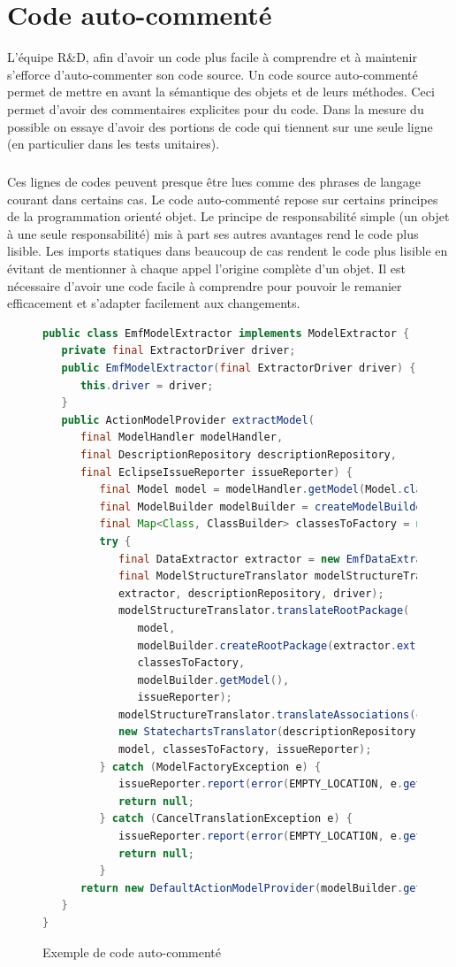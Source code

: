 \section{Code auto-commenté}\label{autoComm}
L'équipe R\&D, afin d'avoir un code plus facile à comprendre et à maintenir s'efforce d'auto-commenter son code source. Un code source auto-commenté permet de mettre en avant la sémantique des objets et de leurs méthodes. Ceci permet d'avoir des commentaires explicites pour du code. Dans la mesure du possible on essaye d'avoir des portions de code qui tiennent sur une seule ligne (en particulier dans les tests unitaires).
\subparagraph*{}Ces lignes de codes peuvent presque être lues comme des phrases de langage courant dans certains cas. Le code auto-commenté repose sur certains principes de la programmation orienté objet. Le principe de responsabilité simple (un objet à une seule responsabilité) mis à part ses autres avantages rend le code plus lisible. Les imports statiques dans beaucoup de cas rendent le code plus lisible en évitant de mentionner à chaque appel l'origine complète d'un objet. Il est nécessaire d'avoir une code facile à comprendre pour pouvoir le remanier efficacement et s'adapter facilement aux changements. 
\begin{figure}[!ht]
\centering
\begin{lstlisting}[language=java]
public class EmfModelExtractor implements ModelExtractor {
   private final ExtractorDriver driver;
   public EmfModelExtractor(final ExtractorDriver driver) {
      this.driver = driver;
   }
   public ActionModelProvider extractModel(
      final ModelHandler modelHandler,
      final DescriptionRepository descriptionRepository,
      final EclipseIssueReporter issueReporter) {
         final Model model = modelHandler.getModel(Model.class);
         final ModelBuilder modelBuilder = createModelBuilder(model.getName());
         final Map<Class, ClassBuilder> classesToFactory = new TreeMap<Class, ClassBuilder>(NAMED_ELEMENTS_COMPARATOR);
         try {
            final DataExtractor extractor = new EmfDataExtractor(driver);
            final ModelStructureTranslator modelStructureTranslator = new ModelStructureTranslator(
            extractor, descriptionRepository, driver);
            modelStructureTranslator.translateRootPackage(
               model,
               modelBuilder.createRootPackage(extractor.extractUniqueIdentifier(model), "root"),
               classesToFactory,
               modelBuilder.getModel(),
               issueReporter);
            modelStructureTranslator.translateAssociations(classesToFactory, model, issueReporter);
            new StatechartsTranslator(descriptionRepository, driver).translateStatecharts(
            model, classesToFactory, issueReporter);
         } catch (ModelFactoryException e) {
            issueReporter.report(error(EMPTY_LOCATION, e.getMessageBundle()));
            return null;
         } catch (CancelTranslationException e) {
            issueReporter.report(error(EMPTY_LOCATION, e.getMessageBundle()));
            return null;
         }
      return new DefaultActionModelProvider(modelBuilder.getModel());
   }
}
\end{lstlisting}
\caption{Exemple de code auto-commenté}
\label{figure:codeAutoCom}
\end{figure}
